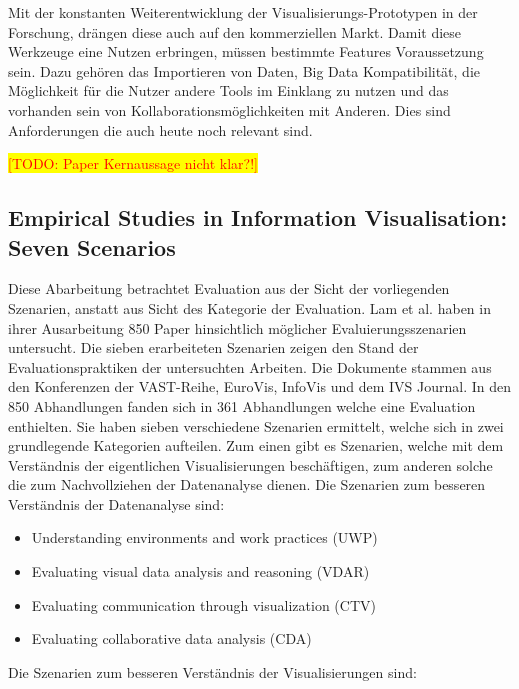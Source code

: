 \documentclass[draft=false
              ,paper=a4
              ,twoside=false
              ,fontsize=11pt
              ,headsepline
              ,BCOR10mm
              ,DIV11
              ]{scrbook}
\newcommand{\TODO}[1]{\colorbox{yellow}{\textcolor{red}{[TODO: #1]}}}
\begin{document}
Mit der konstanten Weiterentwicklung der Visualisierungs-Prototypen in der Forschung, drängen diese auch auf den kommerziellen Markt. Damit diese Werkzeuge eine Nutzen erbringen, müssen bestimmte Features Voraussetzung sein. Dazu gehören das Importieren von Daten, Big Data Kompatibilität, die Möglichkeit für die Nutzer andere Tools im Einklang zu nutzen und das vorhanden sein von Kollaborationsmöglichkeiten mit Anderen. Dies sind Anforderungen die auch heute noch relevant sind.

\TODO{Paper Kernaussage nicht klar?!}


\subsection{Empirical Studies in Information Visualisation: Seven Scenarios} %
\label{sub:empirical_studies_in_information_visualisation_seven_scenarios}
Diese Abarbeitung betrachtet Evaluation aus der Sicht der vorliegenden Szenarien, anstatt aus Sicht des Kategorie der Evaluation. Lam et al. haben in ihrer Ausarbeitung \cite{lam_empirical_2012} 850 Paper hinsichtlich möglicher Evaluierungsszenarien untersucht. Die sieben erarbeiteten Szenarien zeigen den Stand der Evaluationspraktiken der untersuchten Arbeiten. Die Dokumente stammen aus den Konferenzen der VAST-Reihe, EuroVis, InfoVis und dem IVS Journal. In den 850 Abhandlungen fanden sich in 361 Abhandlungen welche eine Evaluation enthielten. Sie haben sieben verschiedene Szenarien ermittelt, welche sich in zwei grundlegende Kategorien aufteilen. Zum einen gibt es Szenarien, welche mit dem Verständnis der eigentlichen Visualisierungen beschäftigen, zum anderen solche die zum Nachvollziehen der Datenanalyse dienen. 
Die Szenarien zum besseren Verständnis der Datenanalyse sind:

\begin{itemize}
  \item Understanding environments and work practices (UWP)
  \item Evaluating visual data analysis and reasoning (VDAR)
  \item Evaluating communication through visualization (CTV)
  \item Evaluating collaborative data analysis (CDA)
\end{itemize}

Die Szenarien zum besseren Verständnis der Visualisierungen sind:
\end{document}
